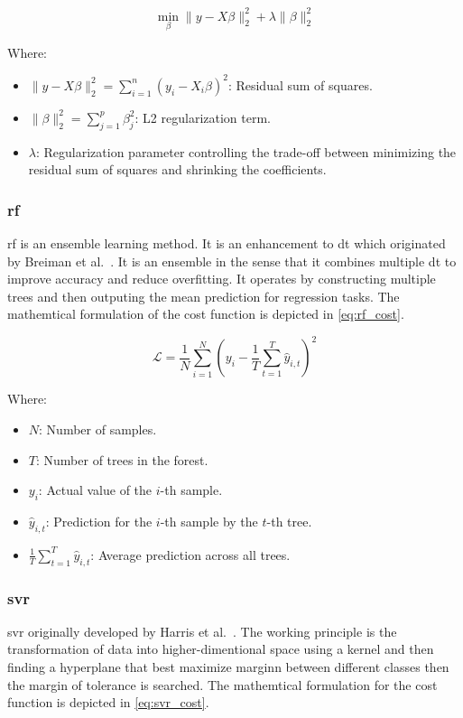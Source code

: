 \begin{equation}
    \min_{\beta} \| y - X\beta \|_2^2 + \lambda \|\beta\|_2^2
\label{eq:ridge_cost}
\end{equation}
    
Where:
\begin{itemize}
    \item \( \| y - X\beta \|_2^2 = \sum_{i=1}^n (y_i - X_i \beta)^2 \): Residual sum of squares.
    \item \( \|\beta\|_2^2 = \sum_{j=1}^p \beta_j^2 \): L2 regularization term.
    \item \( \lambda \): Regularization parameter controlling the trade-off between minimizing the residual sum of squares and shrinking the coefficients.
\end{itemize}

\subsubsection{\ac{rf}}\label{sec:rf}

\ac{rf} is an ensemble learning method. It is an enhancement to \ac{dt} which originated by Breiman et al.~\citep{breiman2001random}. 
It is an ensemble in the sense that it combines multiple \ac{dt} to improve accuracy and reduce overfitting. 
It operates by constructing multiple trees and then outputing the mean prediction for regression tasks. 
The mathemtical formulation of the cost function is depicted in \cref{eq:rf_cost}. 

\begin{equation}
    \mathcal{L} = \frac{1}{N} \sum_{i=1}^{N} \left( y_i - \frac{1}{T} \sum_{t=1}^{T} \hat{y}_{i,t} \right)^2
    \label{eq:rf_cost}
    \end{equation}
    
Where:
\begin{itemize}
    \item \( N \): Number of samples.
    \item \( T \): Number of trees in the forest.
    \item \( y_i \): Actual value of the \( i \)-th sample.
    \item \( \hat{y}_{i,t} \): Prediction for the \( i \)-th sample by the \( t \)-th tree.
    \item \( \frac{1}{T} \sum_{t=1}^{T} \hat{y}_{i,t} \): Average prediction across all trees.
\end{itemize}

\subsubsection{\ac{svr}}\label{sec:svr}
\ac{svr} originally developed by Harris et al.~\citep{drucker1997svr}. The working principle is the transformation of data into higher-dimentional space using a kernel 
and then finding a hyperplane that best maximize marginn between different classes then the margin of tolerance is searched. 
The mathemtical formulation for the cost function is depicted in \cref{eq:svr_cost}.

